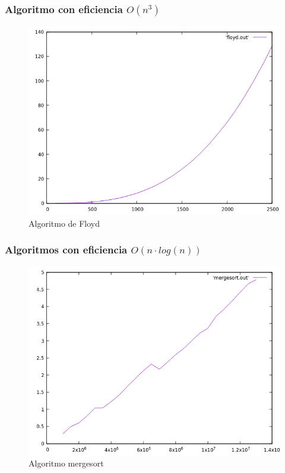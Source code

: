 \documentclass[12pt,spanish]{article}
\begin{document}
\subsubsection{Algoritmo con eficiencia $O(n^3)$}
\begin{figure}[H]
\centering
\includegraphics[scale=0.75]{empirica_floyd.png}
\caption{Algoritmo de Floyd}
\end{figure}

\subsubsection{Algoritmos con eficiencia $O(n \cdot log(n))$}

\begin{figure}[H]
\centering
\includegraphics[scale=0.75]{empirica_mergesort.png}
\caption{Algoritmo mergesort}
\end{figure}
\end{document}
